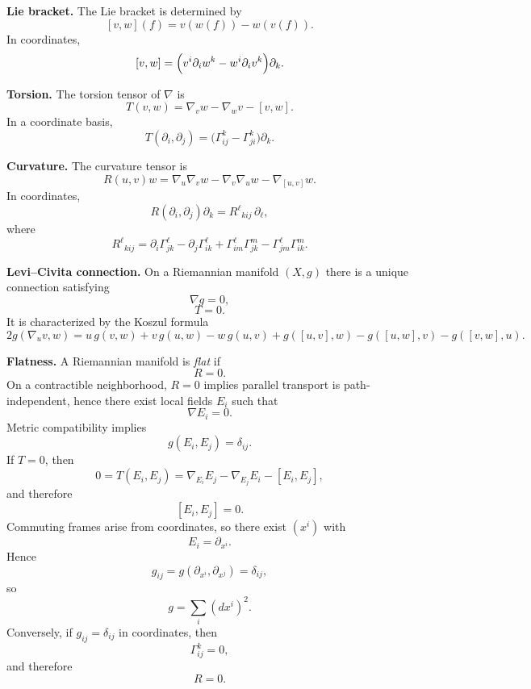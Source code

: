 \documentclass[12pt,a4paper]{article}
\theoremstyle{plain}
\theoremstyle{definition}      %
\begin{document}
\textbf{Lie bracket.}
The Lie bracket is determined by
\[
[v,w](f)=v(w(f))-w(v(f)).
\]
In coordinates,
\[
[v,w]
=
\Bigl(v^i\partial_i w^k-w^i\partial_i v^k\Bigr)\partial_k.
\]

\textbf{Torsion.}
The torsion tensor of $\nabla$ is
\[
T(v,w)=\nabla_v w-\nabla_w v-[v,w].
\]
In a coordinate basis,
\[
T(\partial_i,\partial_j)
=
\bigl(\Gamma^k_{ij}-\Gamma^k_{ji}\bigr)\partial_k.
\]

\textbf{Curvature.}
The curvature tensor is
\[
R(u,v)w=\nabla_u\nabla_v w-\nabla_v\nabla_u w-\nabla_{[u,v]}w.
\]
In coordinates,
\[
R(\partial_i,\partial_j)\partial_k
=
R^{\ell}{}_{kij}\,\partial_\ell,
\]
where
\[
R^{\ell}{}_{kij}
=
\partial_i\Gamma^\ell_{jk}
-
\partial_j\Gamma^\ell_{ik}
+
\Gamma^\ell_{im}\Gamma^m_{jk}
-
\Gamma^\ell_{jm}\Gamma^m_{ik}.
\]

\textbf{Levi--Civita connection.}
On a Riemannian manifold $(X,g)$ there is a unique connection satisfying
\[
\nabla g=0,
\]
\[
T=0.
\]
It is characterized by the Koszul formula
\[
2g(\nabla_u v,w)
=
u\,g(v,w)+v\,g(u,w)-w\,g(u,v)
+
g([u,v],w)-g([u,w],v)-g([v,w],u).
\]

\textbf{Flatness.}
A Riemannian manifold is \emph{flat} if
\[
R=0.
\]
On a contractible neighborhood, $R=0$ implies parallel transport is path-independent, hence there exist local fields $E_i$ such that
\[
\nabla E_i=0.
\]
Metric compatibility implies
\[
g(E_i,E_j)=\delta_{ij}.
\]
If $T=0$, then
\[
0=T(E_i,E_j)=\nabla_{E_i}E_j-\nabla_{E_j}E_i-[E_i,E_j],
\]
and therefore
\[
[E_i,E_j]=0.
\]
Commuting frames arise from coordinates, so there exist $(x^i)$ with
\[
E_i=\partial_{x^i}.
\]
Hence
\[
g_{ij}=g(\partial_{x^i},\partial_{x^j})=\delta_{ij},
\]
so
\[
g=\sum_i (dx^i)^2.
\]
Conversely, if $g_{ij}=\delta_{ij}$ in coordinates, then
\[
\Gamma^k_{ij}=0,
\]
and therefore
\[
R=0.
\]
\end{document}
